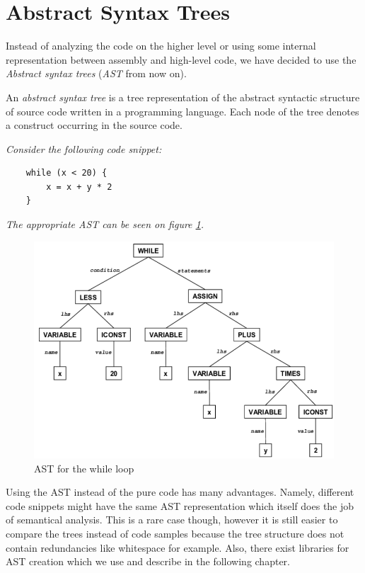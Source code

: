 \section{Abstract Syntax Trees}
\label{sec:AST}

Instead of analyzing the code on the higher level or using some internal representation between assembly and high-level code, we have decided to use the \emph{Abstract syntax trees} (\emph{AST} from now on).

\begin{defn}
    An \emph{abstract syntax tree} is a tree representation of the abstract syntactic structure of source code written in a programming language. Each node of the tree denotes a construct occurring in the source code.
\end{defn}

\begin{exmp}
    \textit{Consider the following code snippet:}

    \begin{lstlisting}
    while (x < 20) {
        x = x + y * 2
    }
    \end{lstlisting}

    \textit{The appropriate AST can be seen on figure \ref{fig:WhileAST}.}
\end{exmp}

\begin{figure}
    \centering
    \includegraphics[scale=0.6]{res/WhileAST.PNG}
    \caption{AST for the while loop}
    \label{fig:WhileAST}
\end{figure}

Using the AST instead of the pure code has many advantages. Namely, different code snippets might have the same AST representation which itself does the job of semantical analysis. This is a rare case though, however it is still easier to compare the trees instead of code samples because the tree structure does not contain redundancies like whitespace for example. Also, there exist libraries for AST creation which we use and describe in the following chapter.

